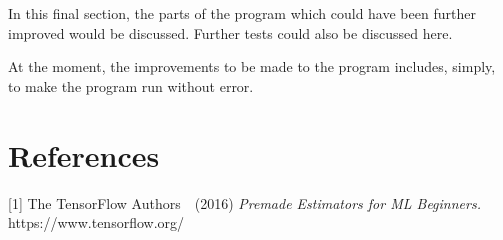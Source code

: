 \documentclass{article}
\begin{document}
In this final section, the parts of the program which could have
been further improved would be discussed. Further tests could also
be discussed here.

At the moment, the improvements to be made to the program includes,
simply, to make the program run without error.

\section*{References}

\small

[1] The TensorFlow Authors\ \ (2016) {\it Premade Estimators for ML
Beginners.} https://www.tensorflow.org/
\end{document}
